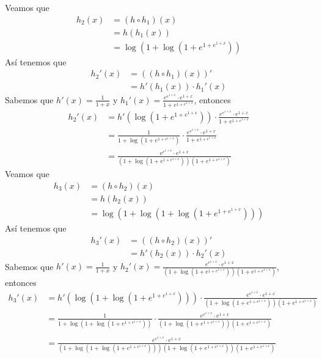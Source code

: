 \documentclass[a4paper]{article}
\begin{document}
Veamos que 
\begin{align*}
    h_{2}\left(x\right) &= \left(h \circ h_{1}\right)(x) \\
                        &= h(h_{1}(x)) \\ 
                        &= \log{\left(1 + \log{\left(1 + e^{1 + e^{1 + x}}\right)}\right)}  
\end{align*}
Así tenemos que
\begin{align*}
    h_{2}'(x) &= \left(\left(h \circ h_{1}\right)(x)\right)' \\
              &= h'(h_{1}(x))\cdot h_{1}'(x)
\end{align*}
Sabemos que \(h'(x) = \frac{1}{1 + x}\) y \(h_{1}'(x) = \frac{e^{e^{1 + x}} \cdot e^{1 + x}}{1 + e^{1 + e^{1 + x}}} \), entonces
\begin{align*}
    h_{2}'(x) &= h'\left(\log{\left(1 + e^{1 + e^{1 + x}}\right)}\right) \cdot \frac{e^{e^{1 + x}} \cdot e^{1 + x}}{1 + e^{1 + e^{1 + x}}} \\
              &= \frac{1}{1 + \log{\left(1 + e^{1 + e^{1 + x}}\right)}} \cdot \frac{e^{e^{1 + x}} \cdot e^{1 + x}}{1 + e^{1 + e^{1 + x}}} \\
              &= \frac{e^{e^{1 + x}} \cdot e^{1 + x}}{\left(1 + \log{\left(1 + e^{1 + e^{1 + x}}\right)}\right)\left(1 + e^{1 + e^{1 + x}}\right)}
\end{align*}
Veamos que 
\begin{align*}
    h_{3}\left(x\right) &= \left(h \circ h_{2}\right)(x) \\
                        &= h(h_{2}(x)) \\ 
                        &= \log{\left(1 + \log{\left(1 + \log{\left(1 + e^{1 + e^{1 + x}}\right)}\right)}\right)}  
\end{align*}
Así tenemos que
\begin{align*}
    h_{3}'(x) &= \left(\left(h \circ h_{2}\right)(x)\right)' \\
              &= h'(h_{2}(x))\cdot h_{2}'(x)
\end{align*}
Sabemos que \(h'(x) = \frac{1}{1 + x}\) y \(h_{2}'(x) = \frac{e^{e^{1 + x}} \cdot e^{1 + x}}{\left(1 + \log{\left(1 + e^{1 + e^{1 + x}}\right)}\right)\left(1 + e^{1 + e^{1 + x}}\right)} \), entonces
\begin{align*}
    h_{3}'(x) &= h'\left(\log{\left(1 + \log{\left(1 + e^{1 + e^{1 + x}}\right)}\right)}\right) \cdot 
                    \frac{e^{e^{1 + x}} \cdot e^{1 + x}}{\left(1 + \log{\left(1 + e^{1 + e^{1 + x}}\right)}\right)\left(1 + e^{1 + e^{1 + x}}\right)} \\
              &= \frac{1}{1 + \log{\left(1 + \log{\left(1 + e^{1 + e^{1 + x}}\right)}\right)}} \cdot 
              \frac{e^{e^{1 + x}} \cdot e^{1 + x}}{\left(1 + \log{\left(1 + e^{1 + e^{1 + x}}\right)}\right)\left(1 + e^{1 + e^{1 + x}}\right)} \\ \\
              &= \frac{e^{e^{1 + x}} \cdot e^{1 + x}}{\left(1 + \log{\left(1 + \log{\left(1 + e^{1 + e^{1 + x}}\right)}\right)}\right)
              \left(1 + \log{\left(1 + e^{1 + e^{1 + x}}\right)}\right)\left(1 + e^{1 + e^{1 + x}}\right)}
\end{align*}
\end{document}
